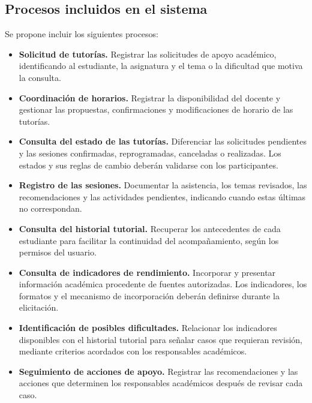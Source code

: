 \documentclass[11pt,a4paper]{article}
\begin{document}
\subsection{Procesos incluidos en el sistema}

Se propone incluir los siguientes procesos:

\begin{itemize}

    \item \textbf{Solicitud de tutorías.}
    Registrar las solicitudes de apoyo académico,
    identificando al estudiante, la asignatura y
    el tema o la dificultad que motiva la consulta.

    \item \textbf{Coordinación de horarios.}
    Registrar la disponibilidad del docente y gestionar
    las propuestas, confirmaciones y modificaciones
    de horario de las tutorías.

    \item \textbf{Consulta del estado de las tutorías.}
    Diferenciar las solicitudes pendientes y las
    sesiones confirmadas, reprogramadas, canceladas
    o realizadas. Los estados y sus reglas de cambio
    deberán validarse con los participantes.

    \item \textbf{Registro de las sesiones.}
    Documentar la asistencia, los temas revisados,
    las recomendaciones y las actividades pendientes,
    indicando cuando estas últimas no correspondan.

    \item \textbf{Consulta del historial tutorial.}
    Recuperar los antecedentes de cada estudiante
    para facilitar la continuidad del acompañamiento,
    según los permisos del usuario.

    \item \textbf{Consulta de indicadores de rendimiento.}
    Incorporar y presentar información académica
    procedente de fuentes autorizadas. Los indicadores,
    los formatos y el mecanismo de incorporación
    deberán definirse durante la elicitación.

    \item \textbf{Identificación de posibles dificultades.}
    Relacionar los indicadores disponibles con el
    historial tutorial para señalar casos que requieran
    revisión, mediante criterios acordados con los
    responsables académicos.

    \item \textbf{Seguimiento de acciones de apoyo.}
    Registrar las recomendaciones y las acciones
    que determinen los responsables académicos
    después de revisar cada caso.


\end{itemize}
\end{document}
